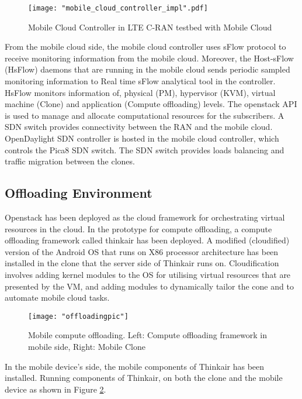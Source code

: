 \documentclass[12pt,journal,compsoc, onecolumn]{IEEEtran}
\begin{document}
\begin{figure}
\centering
  \texttt{[image: "mobile\_cloud\_controller\_impl".pdf]}
  \caption{\label{fig:mccontrollerimpl} Mobile Cloud Controller in LTE C-RAN testbed with Mobile Cloud }
\end{figure}

From the mobile cloud side, the mobile cloud controller uses sFlow protocol to receive monitoring information from the mobile cloud. Moreover, the Host-sFlow (HsFlow) daemons that are running in the mobile cloud sends periodic sampled monitoring information to Real time sFlow analytical tool in the controller. HsFlow monitors information of, physical (PM), hypervisor (KVM), virtual machine (Clone) and application (Compute offloading) levels. The openstack API is used to manage and allocate computational resources for the subscribers. A SDN switch provides connectivity between the RAN and the mobile cloud. OpenDaylight SDN controller is hosted in the mobile cloud controller, which controls the Pica8 SDN switch. The SDN switch provides loads balancing and traffic migration between the clones.

\subsection{Offloading Environment}

Openstack has been deployed as the cloud framework for orchestrating virtual resources in the cloud. In the prototype for compute offloading, a compute offloading framework called thinkair \cite{6195845} has been deployed. A modified (cloudified) version of the Android OS that runs on X86 processor architecture has been installed in the clone that the server side of Thinkair runs on. Cloudification involves adding kernel modules to the OS for utilising virtual resources that are presented by the VM, and adding modules to dynamically tailor the cone and to automate mobile cloud tasks. 

\begin{figure}
\centering
  \texttt{[image: "offloadingpic"]}
  \caption{\label{fig:offloadingpic} Mobile compute offloading. Left: Compute offloading framework in mobile side, Right: Mobile Clone }
\end{figure}

In the mobile device's side, the mobile components of Thinkair has been installed. Running components of Thinkair, on both the clone and the mobile device as shown in Figure \ref{fig:offloadingpic}.
\end{document}
